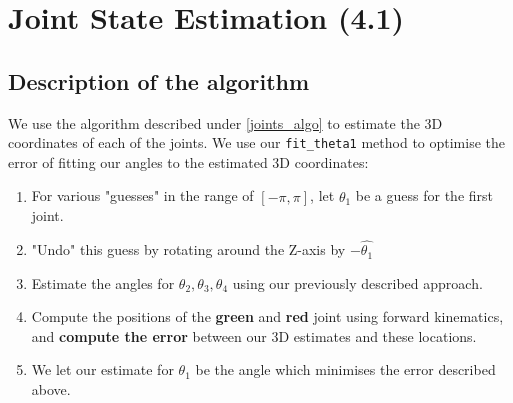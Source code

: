 \section{Joint State Estimation (4.1)}

\subsection{Description of the algorithm}
We use the algorithm described under \ref{joints_algo} to estimate the
3D coordinates of each of the joints.
We use our \texttt{fit\_theta1} method to optimise the error of fitting
our angles to the estimated 3D coordinates:
\begin{enumerate}
    \item
        For various "guesses" in the range of $[-\pi, \pi]$, let
        $\hat{\theta_1}$ be a guess for the first joint.
    \item
        "Undo" this guess by rotating around the Z-axis by $-\hat{\theta_1}$
    \item
        Estimate the angles for $\theta_2, \theta_3, \theta_4$ using our
        previously described approach.
    \item
        Compute the positions of the \textbf{green} and \textbf{red}
        joint using forward kinematics, and \textbf{compute the error}
        between our 3D estimates and these locations.
    \item
        We let our estimate for $\theta_1$ be the angle which minimises
        the error described above.

\end{enumerate}

